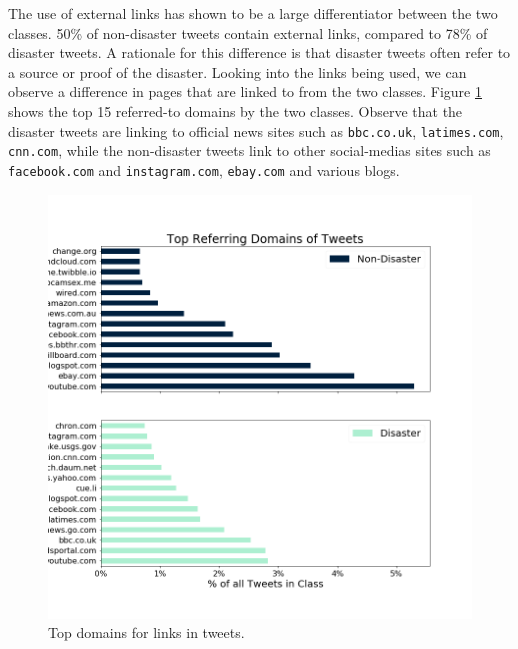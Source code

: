 \documentclass[journal, ]{IEEEtran}
\let\MYoriglatexcaption\caption
\renewcommand{\caption}[2][\relax]{\MYoriglatexcaption[#2]{#2}}
\begin{document}
The use of external links has shown to be a large differentiator between the
two classes. 50\% of non-disaster tweets contain external links, compared to
78\% of disaster tweets. A rationale for this difference is that disaster
tweets often refer to a source or proof of the disaster. Looking into the links
being used, we can observe a difference in pages that are linked to from the
two classes. Figure \ref{fig:domain_freq} shows the top 15 referred-to domains
by the two classes. Observe that the disaster tweets are linking to official
news sites such as \texttt{bbc.co.uk}, \texttt{latimes.com}, \texttt{cnn.com},
while the non-disaster tweets link to other social-medias sites such as
\texttt{facebook.com} and \texttt{instagram.com}, \texttt{ebay.com} and various
blogs. 

\begin{figure}[hbt!]
  \centering
  \includegraphics[width=\linewidth]{../figures/domain_freq.png}
  \caption{Top domains for links in tweets.}
  \label{fig:domain_freq}
\end{figure}
\end{document}
